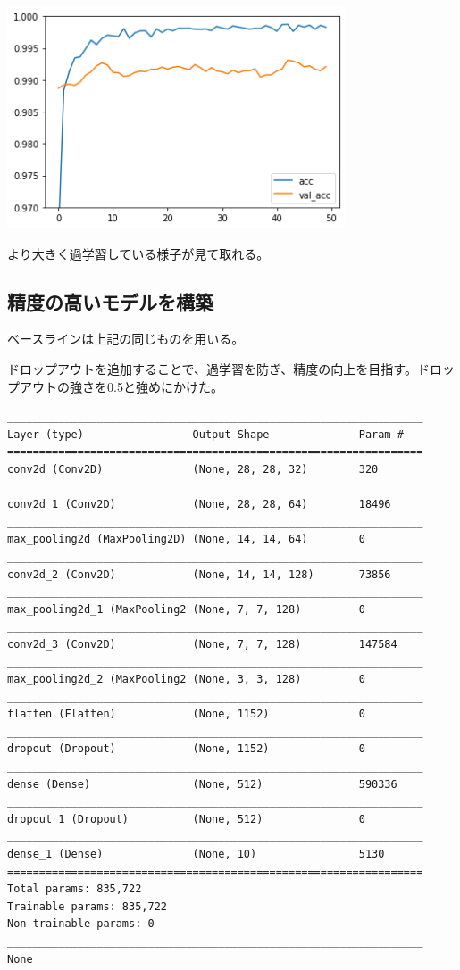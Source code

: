 \documentclass[platex,dvipdfmx]{jsarticle}
\begin{document}
\includegraphics[width=10cm]{b1101_acc.png}

より大きく過学習している様子が見て取れる。

\subsection{精度の高いモデルを構築}

ベースラインは上記の同じものを用いる。

ドロップアウトを追加することで、過学習を防ぎ、精度の向上を目指す。ドロップアウトの強さを0.5と強めにかけた。

\begin{lstlisting}
_________________________________________________________________
Layer (type)                 Output Shape              Param #   
=================================================================
conv2d (Conv2D)              (None, 28, 28, 32)        320       
_________________________________________________________________
conv2d_1 (Conv2D)            (None, 28, 28, 64)        18496     
_________________________________________________________________
max_pooling2d (MaxPooling2D) (None, 14, 14, 64)        0         
_________________________________________________________________
conv2d_2 (Conv2D)            (None, 14, 14, 128)       73856     
_________________________________________________________________
max_pooling2d_1 (MaxPooling2 (None, 7, 7, 128)         0         
_________________________________________________________________
conv2d_3 (Conv2D)            (None, 7, 7, 128)         147584    
_________________________________________________________________
max_pooling2d_2 (MaxPooling2 (None, 3, 3, 128)         0         
_________________________________________________________________
flatten (Flatten)            (None, 1152)              0         
_________________________________________________________________
dropout (Dropout)            (None, 1152)              0         
_________________________________________________________________
dense (Dense)                (None, 512)               590336    
_________________________________________________________________
dropout_1 (Dropout)          (None, 512)               0         
_________________________________________________________________
dense_1 (Dense)              (None, 10)                5130      
=================================================================
Total params: 835,722
Trainable params: 835,722
Non-trainable params: 0
_________________________________________________________________
None  
\end{lstlisting}
\end{document}
